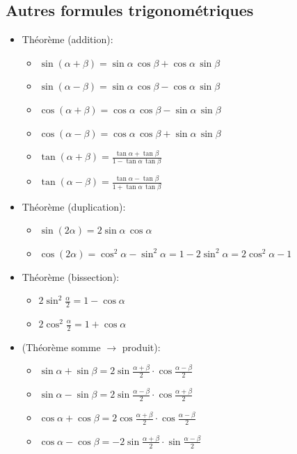 \documentclass[12pt,a4paper]{article}
\begin{document}
\subsection{Autres formules trigonométriques}
\begin{itemize}[label=$\bullet$]
\item \textcolor{th!60!black}{Théorème (addition)}:
\begin{itemize}[label=$\circ$]
\item $\sin(\alpha + \beta)=\sin\alpha\,\cos\beta + \cos\alpha\,\sin\beta$
\item $\sin(\alpha - \beta)=\sin\alpha\,\cos\beta - \cos\alpha\,\sin\beta$
\item $\cos(\alpha + \beta)=\cos\alpha\,\cos\beta - \sin\alpha\,\sin\beta$
\item $\cos(\alpha - \beta)=\cos\alpha\,\cos\beta + \sin\alpha\,\sin\beta$
\item $\tan(\alpha + \beta)=\displaystyle\frac{\tan\alpha + \tan\beta}{1 - \tan\alpha\,\tan\beta}$
\item $\tan(\alpha - \beta)=\displaystyle\frac{\tan\alpha - \tan\beta}{1 + \tan\alpha\,\tan\beta}$
\end{itemize}
\item \textcolor{th!60!black}{Théorème (duplication)}:
\begin{itemize}[label=$\circ$]
\item $\sin(2\alpha)=2\sin\alpha\,\cos\alpha$
\item $\cos(2\alpha)=\cos^2\alpha-\sin^2\alpha=1-2\sin^2\alpha=2\cos^2\alpha-1$
\end{itemize}
\item \textcolor{th!60!black}{Théorème (bissection)}:
\begin{itemize}[label=$\circ$]
\item $2\sin^2\frac{\alpha}{2}=1-\cos\alpha$
\item $2\cos^2\frac{\alpha}{2}=1+\cos\alpha$
\end{itemize}
\item \textcolor{th!60!black}{(Théorème somme $\rightarrow$ produit)}:
\begin{itemize}[label=$\circ$]
\item $\sin\alpha + \sin\beta=2\sin\frac{\alpha + \beta}{2}\cdot\cos\frac{\alpha - \beta}{2}$
\item $\sin\alpha - \sin\beta=2\sin\frac{\alpha - \beta}{2}\cdot\cos\frac{\alpha + \beta}{2}$
\item $\cos\alpha+\cos\beta=2\cos\frac{\alpha+\beta}{2}\cdot\cos\frac{\alpha-\beta}{2}$
\item $\cos\alpha-\cos\beta=-2\sin\frac{\alpha+\beta}{2}\cdot\sin\frac{\alpha-\beta}{2}$


\end{itemize}
\end{itemize}
\end{document}

